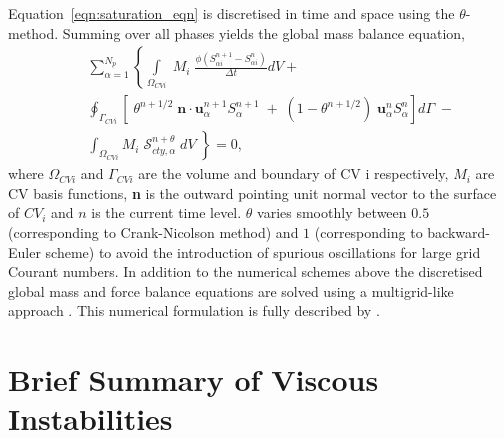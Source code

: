 \documentclass[preprint,authoryear,12pt]{elsarticle}
\begin{document}
Equation~\ref{eqn:saturation_eqn} is discretised in time and space using the $\theta$-method. Summing over all phases yields the global mass balance equation,
\begin{eqnarray}
 && \sum_{\alpha=1}^{N_{p}} \left\{\int\limits_{\Omega_{CVi}} \; M_{i} \; \frac{\phi\left(S_{\alpha i}^{n+1}-S_{\alpha i}^{n}\right)}{\Delta t} dV\right.  + \nonumber\\
 &&  \oint_{\Gamma_{CVi}} \left[\; \theta^{n+1/2}\; {\mathbf n}\cdot {\mathbf u}_{\alpha}^{n+1}S_{\alpha}^{n+1} \; + \; \left(1-\theta^{n+1/2}\right) \; {\mathbf u}_{\alpha}^{n}S_{\alpha}^{n}\right] d\Gamma \;- \nonumber\\
 &&  \left.\int_{\Omega_{CVi}} M_{i} \; \mathcal{S}_{cty,\alpha}^{n+\theta} \; dV\;\right\} =0,
\label{global_mass_balance}
\end{eqnarray}
where $\Omega_{CVi}$ and $\Gamma_{CVi}$ are the volume and boundary of CV i respectively, $M_{i}$ are CV basis functions, \textbf{n} is the outward pointing unit normal vector to the surface of $CV_{i}$ and $n$ is the current time level. $\theta$ varies smoothly between $0.5$ (corresponding to Crank-Nicolson method) and $1$ (corresponding to backward-Euler scheme) to avoid the introduction of spurious oscillations for large grid Courant numbers. In addition to the numerical schemes above the discretised global mass and force balance equations are solved using a multigrid-like approach \citep[see][]{pavlidis2016}. This numerical formulation is fully described by \citet{gomes_2017}\citep[see also][]{salinas2015,adam_2016}. 

\section{Brief Summary of Viscous Instabilities}\label{section:ViscousInstabilities}
\end{document}
